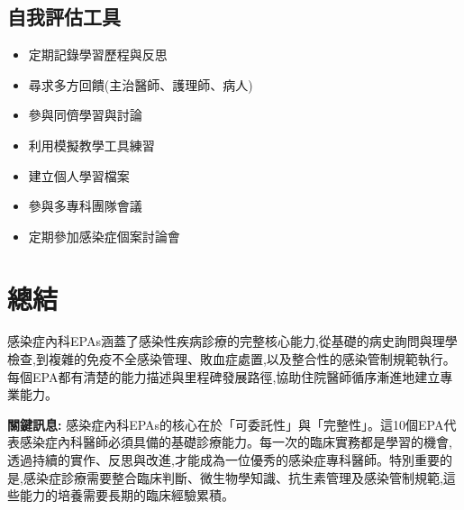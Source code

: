 \documentclass[12pt,a4paper]{article}
\begin{document}
\subsection{自我評估工具}
\begin{itemize}[nosep]
    \item 定期記錄學習歷程與反思
    \item 尋求多方回饋(主治醫師、護理師、病人)
    \item 參與同儕學習與討論
    \item 利用模擬教學工具練習
    \item 建立個人學習檔案
    \item 參與多專科團隊會議
    \item 定期參加感染症個案討論會
\end{itemize}

\section{總結}

感染症內科EPAs涵蓋了感染性疾病診療的完整核心能力,從基礎的病史詢問與理學檢查,到複雜的免疫不全感染管理、敗血症處置,以及整合性的感染管制規範執行。每個EPA都有清楚的能力描述與里程碑發展路徑,協助住院醫師循序漸進地建立專業能力。

\begin{importantbox}
\textbf{關鍵訊息:} 感染症內科EPAs的核心在於「可委託性」與「完整性」。這10個EPA代表感染症內科醫師必須具備的基礎診療能力。每一次的臨床實務都是學習的機會,透過持續的實作、反思與改進,才能成為一位優秀的感染症專科醫師。特別重要的是,感染症診療需要整合臨床判斷、微生物學知識、抗生素管理及感染管制規範,這些能力的培養需要長期的臨床經驗累積。
\end{importantbox}

\end{document}
